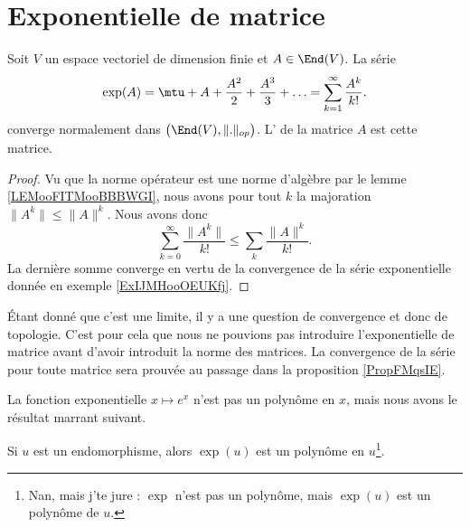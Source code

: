 \section{Exponentielle de matrice}
\label{secAOnIwQM}

\begin{proposition}     \label{PropPEDSooAvSXmY}
    Soit \( V\) un espace vectoriel de dimension finie et \( A\in\End(V)\). La série
    \begin{equation}
        \exp(A)=\mtu+A+\frac{ A^2 }{ 2 }+\frac{ A^3 }{ 3 }+\ldots =\sum_{k=1}^{\infty}\frac{ A^k }{ k! }.
    \end{equation}
    converge normalement dans \( \big( \End(V),\| . \|_{op} \big)\).  L' de la matrice \( A\) est cette matrice.
\end{proposition}

\begin{proof}
    Vu que la norme opérateur est une norme d'algèbre par le lemme \ref{LEMooFITMooBBBWGI}, nous avons pour tout \( k\) la majoration \( \| A^k \|\leq \| A \|^k\). Nous avons donc
    \begin{equation}
        \sum_{k=0}^{\infty}\frac{ \| A^k \| }{ k! }\leq \sum_k\frac{ \| A \|^k }{ k! }.
    \end{equation}
    La dernière somme converge en vertu de la convergence de la série exponentielle donnée en exemple \ref{ExIJMHooOEUKfj}.
\end{proof}

Étant donné que c'est une limite, il y a une question de convergence et donc de topologie. C'est pour cela que nous ne pouvions pas introduire l'exponentielle de matrice avant d'avoir introduit la norme des matrices. La convergence de la série pour toute matrice sera prouvée au passage dans la proposition \ref{PropFMqsIE}.


La fonction exponentielle \(  x\mapsto e^{x}\) n'est pas un polynôme en \( x\), mais nous avons le résultat marrant suivant.
\begin{proposition} \label{PropFMqsIE}
    Si \( u\) est un endomorphisme, alors \( \exp(u)\) est un polynôme en \( u\)\footnote{Nan, mais j'te jure : \( \exp\) n'est pas un polynôme, mais $\exp(u)$ est un polynôme de \( u\).}.
\end{proposition}

